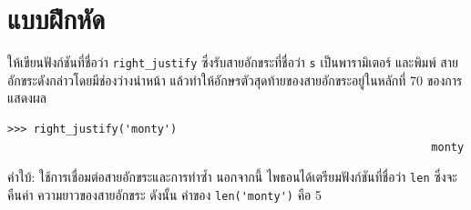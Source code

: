 \section{แบบฝึกหัด}

\begin{exercise}

ให้เขียนฟังก์ชันที่ชื่อว่า \verb"right_justify" ซึ่งรับสายอักขระที่ชื่อว่า {\tt s} เป็นพารามิเตอร์ และพิมพ์
สายอักขระดังกล่าวโดยมีช่องว่างนำหน้า แล้วทำให้อักษรตัวสุดท้ายของสายอักขระอยู่ในหลักที่ 70 ของการแสดงผล 

\begin{verbatim}
>>> right_justify('monty')
                                                                 monty
\end{verbatim}

คำใบ้: ใช้การเชื่อมต่อสายอักขระและการทำซ้ำ นอกจากนี้ ไพธอนได้เตรียมฟังก์ชันที่ชื่อว่า {\tt len} ซึ่งจะคืนค่า
ความยาวของสายอักขระ ดังนั้น ค่าของ \verb"len('monty')" คือ 5

\end{exercise}



